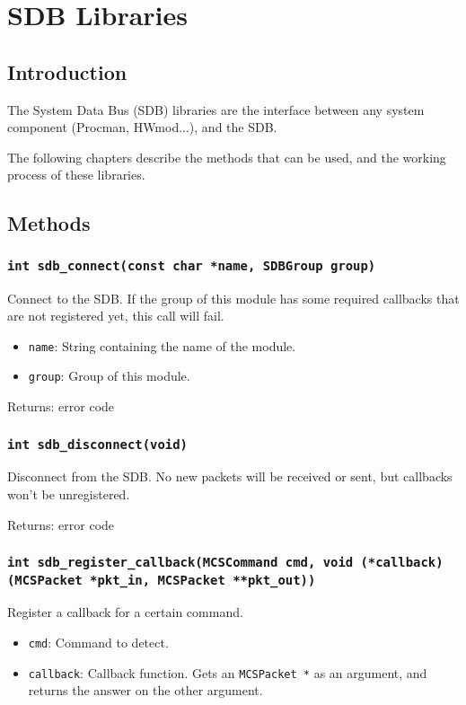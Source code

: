 \documentclass[12pt,a4paper]{report}
\begin{document}
\section*{SDB Libraries}

\subsection*{Introduction}
The System Data Bus (SDB) libraries are the interface between any system component (Procman, HWmod...), and the SDB.

The following chapters describe the methods that can be used, and the working process of these libraries.

\subsection*{Methods}
\subsubsection*{\texttt{int sdb\_connect(const char *name, SDBGroup group)}}
Connect to the SDB. If the group of this module has some required callbacks that are not registered yet, this call will fail.

\begin{itemize}
\item \texttt{name}: String containing the name of the module.
\item \texttt{group}: Group of this module.
\end{itemize}

Returns: error code

\subsubsection*{\texttt{int sdb\_disconnect(void)}}
Disconnect from the SDB. No new packets will be received or sent, but callbacks won't be unregistered.

Returns: error code

\subsubsection*{\texttt{int sdb\_register\_callback(MCSCommand cmd, void (*callback)(MCSPacket *pkt\_in, MCSPacket **pkt\_out))}}
Register a callback for a certain command.

\begin{itemize}
\item \texttt{cmd}: Command to detect.
\item \texttt{callback}: Callback function. Gets an \texttt{MCSPacket *} as an argument, and returns the answer on the other argument.
\end{itemize}
\end{document}
